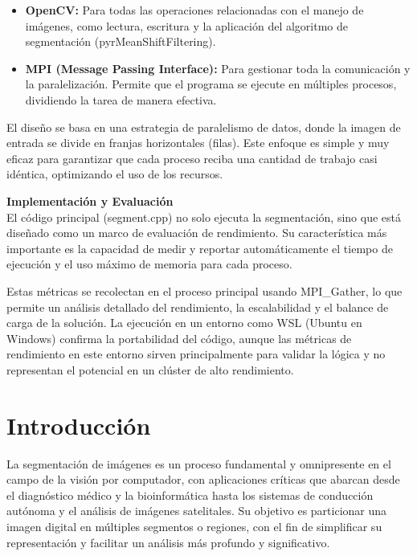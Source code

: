 \documentclass[fleqn,10pt]{article}
\begin{document}
\begin{itemize}
    \item \textbf{OpenCV:} Para todas las operaciones relacionadas con el manejo de imágenes, como lectura, escritura y la aplicación del algoritmo de segmentación (pyrMeanShiftFiltering).
    
    \item \textbf{MPI (Message Passing Interface):} Para gestionar toda la comunicación y la paralelización. Permite que el programa se ejecute en múltiples procesos, dividiendo la tarea de manera efectiva.
\end{itemize}

El diseño se basa en una estrategia de paralelismo de datos, donde la imagen de entrada se divide en franjas horizontales (filas). Este enfoque es simple y muy eficaz para garantizar que cada proceso reciba una cantidad de trabajo casi idéntica, optimizando el uso de los recursos.

\vspace{0.5cm}
\noindent\textbf{Implementación y Evaluación}\\
El código principal (segment.cpp) no solo ejecuta la segmentación, sino que está diseñado como un marco de evaluación de rendimiento. Su característica más importante es la capacidad de medir y reportar automáticamente el tiempo de ejecución y el uso máximo de memoria para cada proceso.

Estas métricas se recolectan en el proceso principal usando MPI\_Gather, lo que permite un análisis detallado del rendimiento, la escalabilidad y el balance de carga de la solución. La ejecución en un entorno como WSL (Ubuntu en Windows) confirma la portabilidad del código, aunque las métricas de rendimiento en este entorno sirven principalmente para validar la lógica y no representan el potencial en un clúster de alto rendimiento.


\clearpage
\section{Introducción}
La segmentación de imágenes es un proceso fundamental y omnipresente en el campo de la visión por computador, con aplicaciones críticas que abarcan desde el diagnóstico médico y la bioinformática hasta los sistemas de conducción autónoma y el análisis de imágenes satelitales. Su objetivo es particionar una imagen digital en múltiples segmentos o regiones, con el fin de simplificar su representación y facilitar un análisis más profundo y significativo.
\end{document}
